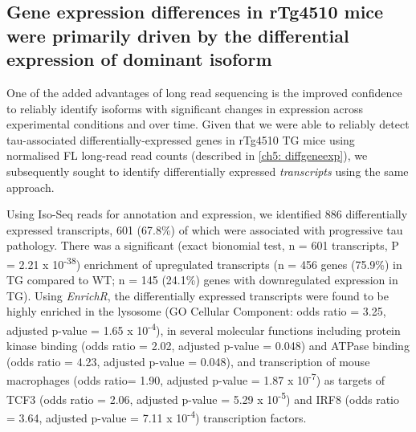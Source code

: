 \clearpage
\subsection{Gene expression differences in rTg4510 mice were primarily driven by the differential expression of dominant isoform}
One of the added advantages of long read sequencing is the improved confidence to reliably identify isoforms with significant changes in expression across experimental conditions and over time. Given that we were able to reliably detect tau-associated differentially-expressed genes in rTg4510 TG mice using normalised FL long-read read counts (described in \cref{ch5: diffgeneexp}), we subsequently sought to identify differentially expressed \textit{transcripts} using the same approach. 

Using Iso-Seq reads for annotation and expression, we identified 886 differentially expressed transcripts, 601 (67.8\%) of which were associated with progressive tau pathology. There was a significant (exact bionomial test, n = 601 transcripts, P = 2.21 x 10\textsuperscript{-38}) enrichment of upregulated transcripts (n = 456 genes (75.9\%) in TG compared to WT; n = 145 (24.1\%) genes with downregulated expression in TG). Using \textit{EnrichR}, the differentially expressed transcripts were found to be highly enriched in the lysosome (GO Cellular Component: odds ratio = 3.25, adjusted p-value = 1.65 x 10\textsuperscript{-4}), in several molecular functions including protein kinase binding (odds ratio = 2.02, adjusted p-value = 0.048) and ATPase binding (odds ratio = 4.23, adjusted p-value = 0.048), and transcription of mouse macrophages (odds ratio= 1.90, adjusted p-value = 1.87 x 10\textsuperscript{-7}) as targets of TCF3 (odds ratio = 2.06, adjusted p-value = 5.29 x 10\textsuperscript{-5}) and IRF8 (odds ratio = 3.64, adjusted p-value = 7.11 x 10\textsuperscript{-4}) transcription factors.  

